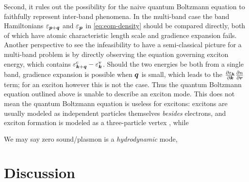\documentclass[hyperref, a4paper]{article}
\begin{document}
Second, it rules out the possibility 
for the naive quantum Boltzmann equation to faithfully represent 
inter-band phenomena.
In the multi-band case the band Hamiltonians 
$\varepsilon_{\vb*{p} + \vb*{q}}$ and $\varepsilon_{\vb*{p}}$ 
in \eqref{eq:eom-density} should be compared directly,
both of which have atomic characteristic length scale 
and gradience expansion fails.
Another perspective to see the infeasibility to have 
a semi-classical picture for a multi-band problem 
is by directly observing the equation 
governing exciton energy,
which contains $\varepsilon^{\text{c}}_{\vb*{k} + \vb*{q}} - \varepsilon^{\text{v}}_{\vb*{k}}$.
Should the two energies be both from a single band, 
gradience expansion is possible when $\vb*{q}$ is small, 
which leads to the $\pdv{\varepsilon_{\vb*{k}}}{\vb*{k}} \pdv{n}{\vb*{r}}$ term;
for an exciton however this is not the case.
Thus the quantum Boltzmann equation outlined above 
is unable to describe an exciton mode.
This does not mean the quantum Boltzmann equation is useless for excitons:
excitons are usually modeled as independent particles themselves
\emph{besides} electrons,
and exciton formation is modeled as 
a three-particle vertex \cite{klimontovich1981quantum},
while 

We may say zero sound/plasmon is a \emph{hydrodynamic} mode,


\section{Discussion}

\printbibliography
\end{document}
